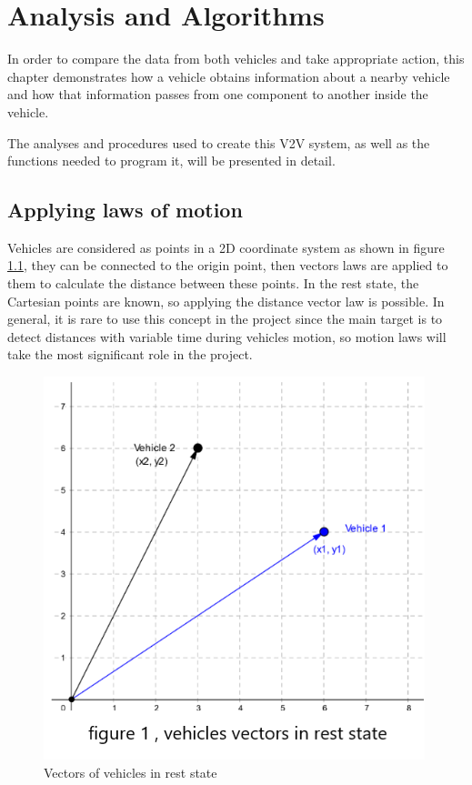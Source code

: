 \chapter{Analysis and Algorithms}


In order to compare the data from both vehicles and take appropriate action, this chapter demonstrates how a vehicle obtains information about a nearby vehicle and how that information passes from one component to another inside the vehicle.
 
The analyses and procedures used to create this V2V system, as well as the functions needed to program it, will be presented in detail.

\section{Applying laws of motion}
Vehicles are considered as points in a 2D coordinate system as shown in figure \ref{fig:vectors},
they can be connected to the origin point, then vectors laws are applied to them to calculate the distance between these points.
In the rest state, the Cartesian points are known, so applying the distance vector law is possible.
In general, it is rare to use this concept in the project since the main target is to detect distances with variable time during vehicles motion, so motion laws will take the most significant role in the project.
\begin{figure}[h]
    \centering
    \includegraphics{figure/6_1.png}
    \caption{Vectors of vehicles in rest state}
    \label{fig:vectors}
\end{figure}


